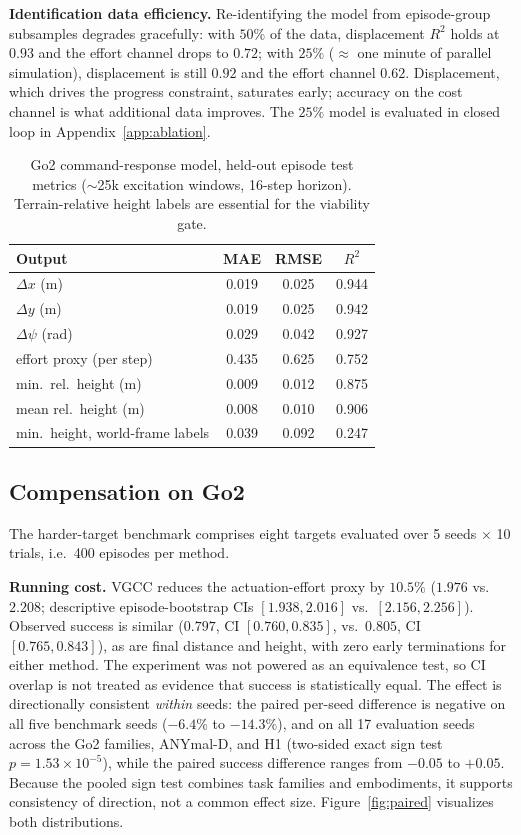 \documentclass{article}
\begin{document}
\textbf{Identification data efficiency.}
Re-identifying the model from episode-group subsamples degrades gracefully: with
$50\%$ of the data, displacement $R^2$ holds at $0.93$ and the effort channel drops
to $0.72$; with $25\%$ ($\approx$ one minute of parallel simulation), displacement
is still $0.92$ and the effort channel $0.62$.
Displacement, which drives the progress constraint, saturates early; accuracy on
the cost channel is what additional data improves. The $25\%$ model is evaluated in
closed loop in Appendix~\ref{app:ablation}.

\begin{table}[t]
\centering
\caption{Go2 command-response model, held-out episode test metrics ($\sim$25k excitation windows, 16-step horizon). Terrain-relative height labels are essential for the viability gate.}
\label{tab:model}
\begin{tabular}{lccc}
\toprule
Output & MAE & RMSE & $R^2$ \\
\midrule
$\Delta x$ (m)            & 0.019 & 0.025 & 0.944 \\
$\Delta y$ (m)            & 0.019 & 0.025 & 0.942 \\
$\Delta \psi$ (rad)       & 0.029 & 0.042 & 0.927 \\
effort proxy (per step)   & 0.435 & 0.625 & 0.752 \\
min.\ rel.\ height (m)    & 0.009 & 0.012 & 0.875 \\
mean rel.\ height (m)     & 0.008 & 0.010 & 0.906 \\
\midrule
min.\ height, world-frame labels & 0.039 & 0.092 & 0.247 \\
\bottomrule
\end{tabular}
\end{table}

\subsection{Compensation on Go2}
\label{sec:results-main}

The harder-target benchmark comprises eight targets evaluated over 5 seeds
$\times$ 10 trials, i.e.\ 400 episodes per method.

\textbf{Running cost.}
VGCC reduces the actuation-effort proxy by $10.5\%$ ($1.976$ vs.\ $2.208$;
descriptive episode-bootstrap CIs $[1.938, 2.016]$ vs.\ $[2.156, 2.256]$). Observed
success is similar ($0.797$, CI $[0.760, 0.835]$, vs.\ $0.805$, CI
$[0.765, 0.843]$), as are final distance and height, with zero early terminations
for either method. The experiment was not powered as an equivalence test, so CI
overlap is not treated as evidence that success is statistically equal.
The effect is directionally consistent \emph{within} seeds: the paired per-seed
difference is negative on all five benchmark seeds ($-6.4\%$ to $-14.3\%$), and on
all 17 evaluation seeds across the Go2 families, ANYmal-D, and H1 (two-sided exact
sign test $p=1.53\times10^{-5}$), while the paired success difference ranges from
$-0.05$ to $+0.05$. Because the pooled sign test combines task families and
embodiments, it supports consistency of direction, not a common effect size.
Figure~\ref{fig:paired} visualizes both distributions.
\end{document}
